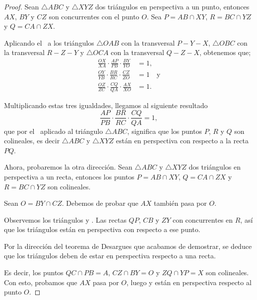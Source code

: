 \begin{proof}
    Sean $\triangle ABC$ y $\triangle XYZ$ dos triángulos en perspectiva a un punto, entonces $AX$, $BY$ y $CZ$ son concurrentes con el punto $O$.
    Sea $P = AB \cap XY$, $R = BC \cap YZ$ y $Q = CA \cap ZX$.

    \begin{multicols}{2}
        \begin{figure}[H]
            \centering
            
        \end{figure}

        Aplicando el~ a los triángulos $\triangle OAB$ con la transversal $P - Y - X$, $\triangle OBC$ con la transversal $R - Z - Y$ y $\triangle OCA$ con la transversal $Q - Z - X$, obtenemos que;
        \begin{align*}
            \frac{OX}{XA} \cdot \frac{AP}{PB} \cdot \frac{BY}{YO} &= 1,\\[1mm]
            \frac{OY}{YB} \cdot \frac{BR}{RC} \cdot \frac{CZ}{ZO} &= 1\quad \text{y}\\[1mm]
            \frac{OZ}{ZC} \cdot \frac{CQ}{QA} \cdot \frac{AX}{XO} &= 1.
        \end{align*}
    \end{multicols}

    Multiplicando estas tres igualdades, llegamos al siguiente resultado
    \[
        \frac{AP}{PB} \cdot \frac{BR}{RC} \cdot \frac{CQ}{QA} = 1,
    \]
    que por el~ aplicado al triángulo $\triangle ABC$, significa que los puntos $P$, $R$ y $Q$ son colineales, es decir $\triangle ABC$ y $\triangle XYZ$ están en perspectiva con respecto a la recta $PQ$.

    Ahora, probaremos la otra dirección.
    Sean $\triangle ABC$ y $\triangle XYZ$ dos triángulos en perspectiva a un recta, entonces los puntos $P = AB \cap XY$, $Q = CA \cap ZX$ y $R = BC \cap YZ$ son colineales.

    \begin{multicols}{2}
        \begin{figure}[H]
            \centering
            
        \end{figure}

        Sean $O = BY \cap CZ$.
        Debemos de probar que $AX$ también pasa por $O$.

        Observemos los triángulos  y .
        Las rectas $QP$, $CB$ y $ZY$ con concurrentes en $R$, así que los triángulos están en perspectiva con respecto a ese punto.

        Por la dirección del teorema de Desargues que acabamos de demostrar, se deduce que los triángulos deben de estar en perspectiva respecto a una recta.
    \end{multicols}

    Es decir, los puntos $QC \cap PB = A$, $CZ \cap BY = O$ y $ZQ \cap YP = X$ son colineales.
    Con esto, probamos que $AX$ pasa por $O$, luego  y  están en perspectiva respecto al punto $O$.
\end{proof}





